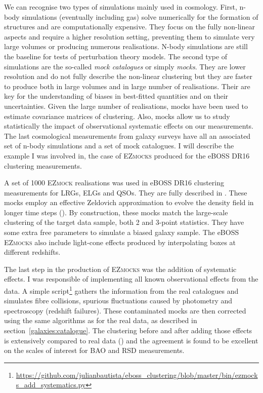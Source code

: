 We can recognise two types of simulations mainly used in cosmology. First, 
n-body simulations (eventually including gas) solve numerically for the formation of structures
and are computationally expensive. They focus on the fully non-linear aspects and require a 
higher resolution setting, preventing them to simulate very large volumes or producing numerous 
realisations. N-body simulations are still the baseline for tests of perturbation theory models. 
The second type of simulations are the so-called \emph{mock catalogues} or simply \emph{mocks}. 
They are lower resolution and do not fully describe the non-linear clustering but they are 
faster to produce both in large volumes and in large number of realisations.
Their are key for the understanding of biases in best-fitted quantities and on their uncertainties. 
Given the large number of realisations, mocks have been used to estimate covariance matrices of 
clustering. Also, mocks allow us to study statistically the impact of observational systematic effects on our 
measurements. The last cosmological measurements from galaxy surveys have all an associated set of 
n-body simulations and a set of mock catalogues. I will describe the example I was involved in, 
the case of \textsc{EZmocks} produced for the eBOSS DR16 clustering measurements. 

A set of 1000 \textsc{EZmock} realisations was used in eBOSS DR16 clustering measurements 
for LRGs, ELGs and QSOs. They are fully described in \cite{zhaoCompletedSDSSIVExtended2021}. 
These mocks employ an effective Zeldovich approximation to evolve 
the density field in longer time steps (\cite{chuangEZmocksExtendingZel2015}). 
By construction, these mocks match the large-scale clustering 
of the target data sample, both 2 and 3-point statistics. 
They have some extra free parameters to simulate a biased galaxy sample. 
The eBOSS \textsc{EZmocks} also include light-cone effects produced by interpolating boxes
at different redshifts. 

The last step in the production of \textsc{EZmocks} was the addition of systematic effects. 
I was responsible of implementing all known observational effects from the data. 
A simple script\footnote{\url{https://github.com/julianbautista/eboss_clustering/blob/master/bin/ezmocks_add_systematics.py}}
gathers the information from the real catalogues and simulates fibre collisions, spurious 
fluctuations caused by photometry and spectroscopy (redshift failures). 
These contaminated mocks are then corrected using the same algorithms as for the real data, 
as described in section~\ref{galaxies:catalogue}. The clustering before and after adding 
those effects is extensively compared to real data (\cite{zhaoCompletedSDSSIVExtended2021}) 
and the agreement is found to be excellent on the scales of interest for BAO and RSD measurements. 



